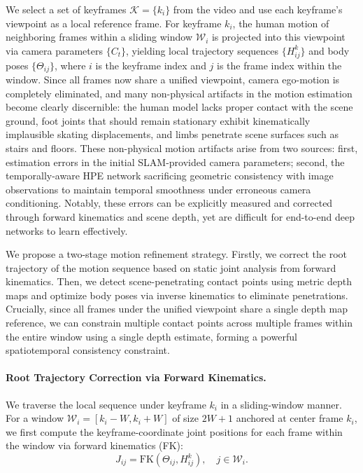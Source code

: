 \documentclass[runningheads]{llncs}
\begin{document}
We select a set of keyframes $\mathcal{K} = \{k_i\}$ from the video and use each keyframe's viewpoint as a local reference frame. For keyframe $k_i$, the human motion of neighboring frames within a sliding window $\mathcal{W}_i$ is projected into this viewpoint via camera parameters $\{C_t\}$, yielding local trajectory sequences $\{H_{ij}^{k}\}$ and body poses $\{\Theta_{ij}\}$, where $i$ is the keyframe index and $j$ is the frame index within the window. Since all frames now share a unified viewpoint, camera ego-motion is completely eliminated, and many non-physical artifacts in the motion estimation become clearly discernible: the human model lacks proper contact with the scene ground, foot joints that should remain stationary exhibit kinematically implausible skating displacements, and limbs penetrate scene surfaces such as stairs and floors. These non-physical motion artifacts arise from two sources: first, estimation errors in the initial SLAM-provided camera parameters; second, the temporally-aware HPE network sacrificing geometric consistency with image observations to maintain temporal smoothness under erroneous camera conditioning. Notably, these errors can be explicitly measured and corrected through forward kinematics and scene depth, yet are difficult for end-to-end deep networks to learn effectively.

We propose a two-stage motion refinement strategy. Firstly, we correct the root trajectory of the motion sequence based on static joint analysis from forward kinematics. Then, we detect scene-penetrating contact points using metric depth maps and optimize body poses via inverse kinematics to eliminate penetrations. Crucially, since all frames under the unified viewpoint share a single depth map reference, we can constrain multiple contact points across multiple frames within the entire window using a single depth estimate, forming a powerful spatiotemporal consistency constraint.

\paragraph{Root Trajectory Correction via Forward Kinematics.}
We traverse the local sequence under keyframe $k_i$ in a sliding-window manner. For a window $\mathcal{W}_i = [k_i{-}W, k_i{+}W]$ of size $2W{+}1$ anchored at center frame $k_i$, we first compute the keyframe-coordinate joint positions for each frame within the window via forward kinematics (FK):
%
\begin{equation}
  J_{ij} = \text{FK}(\Theta_{ij}, H_{ij}^{k}), \quad j \in \mathcal{W}_i.
\end{equation}
\end{document}
